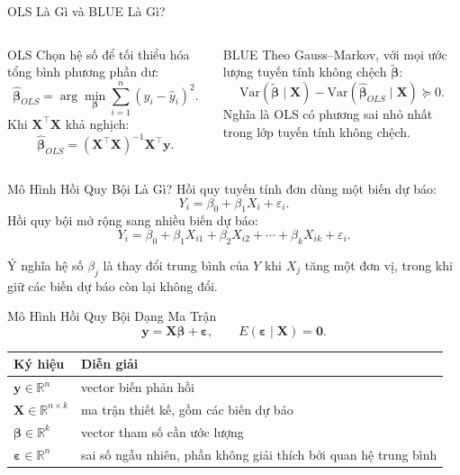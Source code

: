 \documentclass[aspectratio=169,professionalfonts]{beamer}
\begin{document}
\begin{frame}{OLS Là Gì và BLUE Là Gì?}
  \footnotesize
  \begin{columns}[T,onlytextwidth]
      \begin{block}{OLS}
        Chọn hệ số để tối thiểu hóa tổng bình phương phần dư:
        \[
          \hat{\boldsymbol{\beta}}_{OLS}
          =
          \arg\min_{\boldsymbol{\beta}}
          \sum_{i=1}^{n}(y_i-\hat y_i)^2.
        \]
        Khi $\mathbf{X}^{\top}\mathbf{X}$ khả nghịch:
        \[
          \hat{\boldsymbol{\beta}}_{OLS}
          =
          (\mathbf{X}^{\top}\mathbf{X})^{-1}
          \mathbf{X}^{\top}\mathbf{y}.
        \]
      \end{block}
      \begin{block}{BLUE}
        Theo Gauss--Markov, với mọi ước lượng tuyến tính không chệch $\tilde{\boldsymbol{\beta}}$:
        \[
          \mathrm{Var}(\tilde{\boldsymbol{\beta}}\mid \mathbf{X})
          -
          \mathrm{Var}(\hat{\boldsymbol{\beta}}_{OLS}\mid \mathbf{X})
          \succeq 0.
        \]
        Nghĩa là OLS có phương sai nhỏ nhất trong lớp tuyến tính không chệch.
      \end{block}
  \end{columns}
\end{frame}

\begin{frame}{Mô Hình Hồi Quy Bội Là Gì?}
  \small
  Hồi quy tuyến tính đơn dùng một biến dự báo:
  \[
    Y_i=\beta_0+\beta_1X_i+\varepsilon_i.
  \]
  Hồi quy bội mở rộng sang nhiều biến dự báo:
  \[
    Y_i=\beta_0+\beta_1X_{i1}+\beta_2X_{i2}+\cdots+\beta_kX_{ik}+\varepsilon_i.
  \]
  \begin{block}{Ý nghĩa hệ số}
    $\beta_j$ là thay đổi trung bình của $Y$ khi $X_j$ tăng một đơn vị, trong khi giữ các biến dự báo còn lại không đổi.
  \end{block}
\end{frame}

\begin{frame}{Mô Hình Hồi Quy Bội Dạng Ma Trận}
  \small
  \[
    \mathbf{y}=\mathbf{X}\boldsymbol{\beta}+\boldsymbol{\varepsilon},
    \qquad
    E(\boldsymbol{\varepsilon}\mid \mathbf{X})=\mathbf{0}.
  \]
  \vspace{-0.1cm}
  \begin{tabularx}{\textwidth}{@{}lX@{}}
    \toprule
    Ký hiệu & Diễn giải \\
    \midrule
    $\mathbf{y}\in\mathbb{R}^{n}$ & vector biến phản hồi \\
    $\mathbf{X}\in\mathbb{R}^{n\times k}$ & ma trận thiết kế, gồm các biến dự báo \\
    $\boldsymbol{\beta}\in\mathbb{R}^{k}$ & vector tham số cần ước lượng \\
    $\boldsymbol{\varepsilon}\in\mathbb{R}^{n}$ & sai số ngẫu nhiên, phần không giải thích bởi quan hệ trung bình \\
    \bottomrule
  \end{tabularx}
\end{frame}
\end{document}
